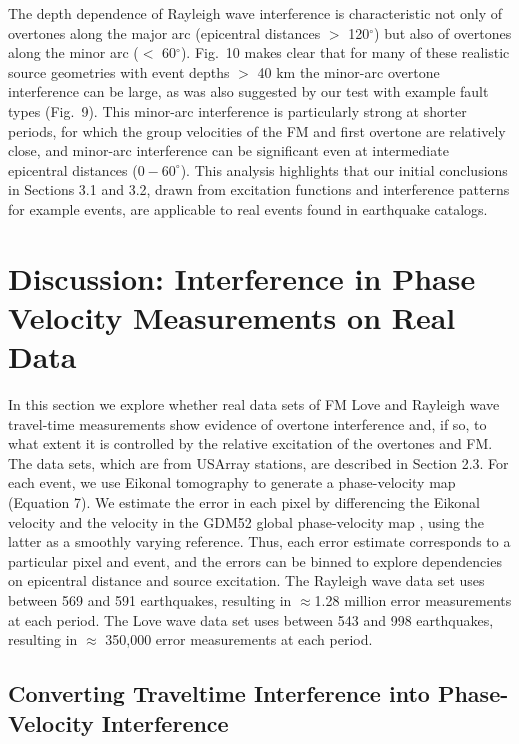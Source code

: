 \documentclass[extra,mreferee]{gji}
\begin{document}
The depth dependence of Rayleigh wave interference is characteristic not only of overtones along the major arc (epicentral distances $>$ 120$^\circ$) but also of overtones along the minor arc ($<$ 60$^\circ$). Fig.\ 10 makes clear that for many of these realistic source geometries with event depths $>$ 40 km the minor-arc overtone interference can be large, as was also suggested by our test with example fault types (Fig.\ 9). This minor-arc interference is particularly strong at shorter periods, for which the group velocities of the FM and first overtone are relatively close, and minor-arc interference can be significant even at intermediate epicentral distances ($0-60^\circ$). This analysis highlights that our initial conclusions in Sections 3.1 and 3.2, drawn from excitation functions and interference patterns for example events, are applicable to real events found in earthquake catalogs.

\section{Discussion: Interference in Phase Velocity Measurements on Real Data}
In this section we explore whether real data sets of FM Love and Rayleigh wave travel-time measurements show evidence of overtone interference and, if so, to what extent it is controlled by the relative excitation of the overtones and FM. The data sets, which are from USArray stations, are described in Section 2.3. For each event, we use Eikonal tomography to generate a phase-velocity map (Equation 7). We estimate the error in each pixel by differencing the Eikonal velocity and the velocity in the GDM52 global phase-velocity map \citep{ekstrom2011global}, using the latter as a smoothly varying reference. Thus, each error estimate corresponds to a particular pixel and event, and the errors can be binned to explore dependencies on epicentral distance and source excitation. The Rayleigh wave data set uses between 569 and 591 earthquakes, resulting in $\approx$1.28 million error measurements at each period. The Love wave data set uses between 543 and 998 earthquakes, resulting in $\approx$ 350,000 error measurements at each period.

\subsection{Converting Traveltime Interference into Phase-Velocity Interference} 
\end{document}
